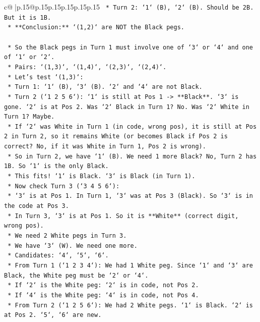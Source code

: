\documentclass{article}
\begin{document}
{\begin{supertabular}{c@{$\;$}|p{.15\linewidth}@{}p{.15\linewidth}p{.15\linewidth}p{.15\linewidth}p{.15\linewidth}p{.15\linewidth}}
{{{\texttt{        *   Turn 2: `1` (B), `2` (B). Should be 2B. But it is 1B.} \\
\texttt{        *   **Conclusion:** `(1,2)` are NOT the Black pegs.} \\
\\ 
\texttt{    *   So the Black pegs in Turn 1 must involve one of `3` or `4` and one of `1` or `2`.} \\
\texttt{    *   Pairs: `(1,3)`, `(1,4)`, `(2,3)`, `(2,4)`.} \\
\texttt{    *   Let's test `(1,3)`:} \\
\texttt{        *   Turn 1: `1` (B), `3` (B). `2` and `4` are not Black.} \\
\texttt{        *   Turn 2 (`1 2 5 6`): `1` is still at Pos 1 {-}> **Black**. `3` is gone. `2` is at Pos 2. Was `2` Black in Turn 1? No. Was `2` White in Turn 1? Maybe.} \\
\texttt{        *   If `2` was White in Turn 1 (in code, wrong pos), it is still at Pos 2 in Turn 2, so it remains White (or becomes Black if Pos 2 is correct? No, if it was White in Turn 1, Pos 2 is wrong).} \\
\texttt{        *   So in Turn 2, we have `1` (B). We need 1 more Black? No, Turn 2 has 1B. So `1` is the only Black.} \\
\texttt{        *   This fits! `1` is Black. `3` is Black (in Turn 1).} \\
\texttt{        *   Now check Turn 3 (`3 4 5 6`):} \\
\texttt{            *   `3` is at Pos 1. In Turn 1, `3` was at Pos 3 (Black). So `3` is in the code at Pos 3.} \\
\texttt{            *   In Turn 3, `3` is at Pos 1. So it is **White** (correct digit, wrong pos).} \\
\texttt{            *   We need 2 White pegs in Turn 3.} \\
\texttt{            *   We have `3` (W). We need one more.} \\
\texttt{            *   Candidates: `4`, `5`, `6`.} \\
\texttt{            *   From Turn 1 (`1 2 3 4`): We had 1 White peg. Since `1` and `3` are Black, the White peg must be `2` or `4`.} \\
\texttt{            *   If `2` is the White peg: `2` is in code, not Pos 2.} \\
\texttt{            *   If `4` is the White peg: `4` is in code, not Pos 4.} \\
\texttt{            *   From Turn 2 (`1 2 5 6`): We had 2 White pegs. `1` is Black. `2` is at Pos 2. `5`, `6` are new.} \\
}}}
\end{supertabular}}
\end{document}
